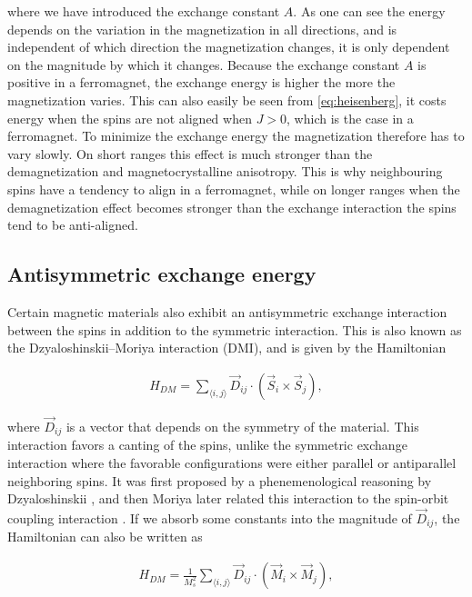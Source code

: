 \documentclass[1p]{elsarticle}		%
\numberwithin{equation}{section}
\begin{document}
where we have introduced the exchange constant $A$. As one can see the energy depends on the variation in the magnetization in all directions, and is independent of which direction the magnetization changes, it is only dependent on the magnitude by which it changes. Because the exchange constant $A$ is positive in a ferromagnet, the exchange energy is higher the more the magnetization varies. This can also easily be seen from \eqref{eq:heisenberg}, it costs energy when the spins are not aligned when $J>0$, which is the case in a ferromagnet. To minimize the exchange energy the magnetization therefore has to vary slowly. On short ranges this effect is much stronger than the demagnetization and magnetocrystalline anisotropy. This is why neighbouring spins have a tendency to align in a ferromagnet, while on longer ranges when the demagnetization effect becomes stronger than the exchange interaction the spins tend to be anti-aligned.

\subsection{Antisymmetric exchange energy}
Certain magnetic materials also exhibit an antisymmetric exchange interaction between the spins in addition to the symmetric interaction. This is also known as the Dzyaloshinskii--Moriya interaction (DMI), and is given by the Hamiltonian

\begin{align}
\label{eq:DMI_Hamiltonian_S}
H_{DM} = \sum_{\langle i,j \rangle} \vec{D}_{ij} \cdot (\vec{S}_i\times\vec{S}_j),
\end{align}

where $\vec{D}_{ij}$ is a vector that depends on the symmetry of the material. This interaction favors a canting of the spins, unlike the symmetric exchange interaction where the favorable configurations were either parallel or antiparallel neighboring spins. It was first proposed by a phenemenological reasoning by Dzyaloshinskii \cite{Dzyaloshinskii1958}, and then Moriya later related this interaction to the spin-orbit coupling interaction \cite{Moriya1960}. If we absorb some constants into the magnitude of $\vec{D}_{ij}$, the Hamiltonian can also be written as

\begin{align}
\label{eq:DMI_Hamiltonian_M}
H_{DM} = \frac{1}{M_s^2}\sum_{\langle i,j \rangle} \vec{D}_{ij} \cdot (\vec{M}_i\times\vec{M}_j),
\end{align}
\end{document}
